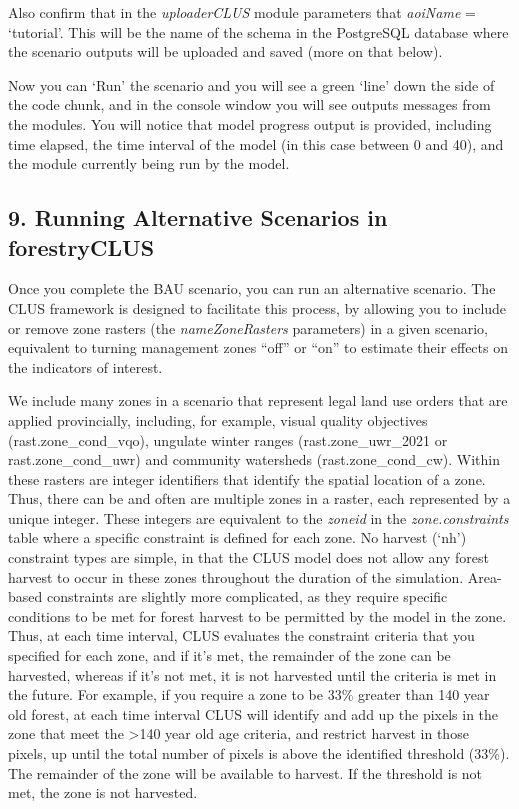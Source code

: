 \documentclass[
]{article}
\begin{document}
Also confirm that in the \emph{uploaderCLUS} module parameters that
\emph{aoiName} = `tutorial'. This will be the name of the schema in the
PostgreSQL database where the scenario outputs will be uploaded and
saved (more on that below).

Now you can `Run' the scenario and you will see a green `line' down the
side of the code chunk, and in the console window you will see outputs
messages from the modules. You will notice that model progress output is
provided, including time elapsed, the time interval of the model (in
this case between 0 and 40), and the module currently being run by the
model.

\hypertarget{running-alternative-scenarios-in-forestryclus}{%
\subsection{9. Running Alternative Scenarios in
forestryCLUS}\label{running-alternative-scenarios-in-forestryclus}}

Once you complete the BAU scenario, you can run an alternative scenario.
The CLUS framework is designed to facilitate this process, by allowing
you to include or remove zone rasters (the \emph{nameZoneRasters}
parameters) in a given scenario, equivalent to turning management zones
``off'' or ``on'' to estimate their effects on the indicators of
interest.

We include many zones in a scenario that represent legal land use orders
that are applied provincially, including, for example, visual quality
objectives (rast.zone\_cond\_vqo), ungulate winter ranges
(rast.zone\_uwr\_2021 or rast.zone\_cond\_uwr) and community watersheds
(rast.zone\_cond\_cw). Within these rasters are integer identifiers that
identify the spatial location of a zone. Thus, there can be and often
are multiple zones in a raster, each represented by a unique integer.
These integers are equivalent to the \emph{zoneid} in the
\emph{zone.constraints} table where a specific constraint is defined for
each zone. No harvest (`nh') constraint types are simple, in that the
CLUS model does not allow any forest harvest to occur in these zones
throughout the duration of the simulation. Area-based constraints are
slightly more complicated, as they require specific conditions to be met
for forest harvest to be permitted by the model in the zone. Thus, at
each time interval, CLUS evaluates the constraint criteria that you
specified for each zone, and if it's met, the remainder of the zone can
be harvested, whereas if it's not met, it is not harvested until the
criteria is met in the future. For example, if you require a zone to be
33\% greater than 140 year old forest, at each time interval CLUS will
identify and add up the pixels in the zone that meet the \textgreater140
year old age criteria, and restrict harvest in those pixels, up until
the total number of pixels is above the identified threshold (33\%). The
remainder of the zone will be available to harvest. If the threshold is
not met, the zone is not harvested.
\end{document}
